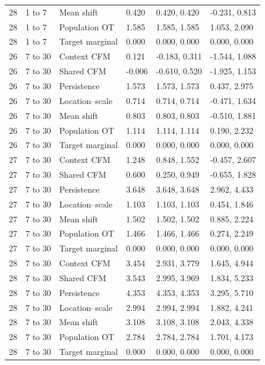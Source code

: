 {\begin{longtable}{@{}p{14mm}p{18mm}p{36mm}p{24mm}p{32mm}p{39mm}@{}}
28 & 1 to 7 & Mean shift & 0.420 & 0.420, 0.420 & -0.231, 0.813\\
28 & 1 to 7 & Population OT & 1.585 & 1.585, 1.585 & 1.053, 2.090\\
28 & 1 to 7 & Target marginal & 0.000 & 0.000, 0.000 & 0.000, 0.000\\
26 & 7 to 30 & Context CFM & 0.121 & -0.183, 0.311 & -1.544, 1.088\\
26 & 7 to 30 & Shared CFM & -0.006 & -0.610, 0.520 & -1.925, 1.153\\
26 & 7 to 30 & Persistence & 1.573 & 1.573, 1.573 & 0.437, 2.975\\
26 & 7 to 30 & Location--scale & 0.714 & 0.714, 0.714 & -0.471, 1.634\\
26 & 7 to 30 & Mean shift & 0.803 & 0.803, 0.803 & -0.510, 1.881\\
26 & 7 to 30 & Population OT & 1.114 & 1.114, 1.114 & 0.190, 2.232\\
26 & 7 to 30 & Target marginal & 0.000 & 0.000, 0.000 & 0.000, 0.000\\
27 & 7 to 30 & Context CFM & 1.248 & 0.848, 1.552 & -0.457, 2.607\\
27 & 7 to 30 & Shared CFM & 0.600 & 0.250, 0.949 & -0.655, 1.828\\
27 & 7 to 30 & Persistence & 3.648 & 3.648, 3.648 & 2.962, 4.433\\
27 & 7 to 30 & Location--scale & 1.103 & 1.103, 1.103 & 0.454, 1.846\\
27 & 7 to 30 & Mean shift & 1.502 & 1.502, 1.502 & 0.885, 2.224\\
27 & 7 to 30 & Population OT & 1.466 & 1.466, 1.466 & 0.274, 2.249\\
27 & 7 to 30 & Target marginal & 0.000 & 0.000, 0.000 & 0.000, 0.000\\
28 & 7 to 30 & Context CFM & 3.454 & 2.931, 3.779 & 1.645, 4.944\\
28 & 7 to 30 & Shared CFM & 3.543 & 2.995, 3.969 & 1.834, 5.233\\
28 & 7 to 30 & Persistence & 4.353 & 4.353, 4.353 & 3.295, 5.710\\
28 & 7 to 30 & Location--scale & 2.994 & 2.994, 2.994 & 1.882, 4.241\\
28 & 7 to 30 & Mean shift & 3.108 & 3.108, 3.108 & 2.043, 4.338\\
28 & 7 to 30 & Population OT & 2.784 & 2.784, 2.784 & 1.701, 4.173\\
28 & 7 to 30 & Target marginal & 0.000 & 0.000, 0.000 & 0.000, 0.000\\
\end{longtable}
}
